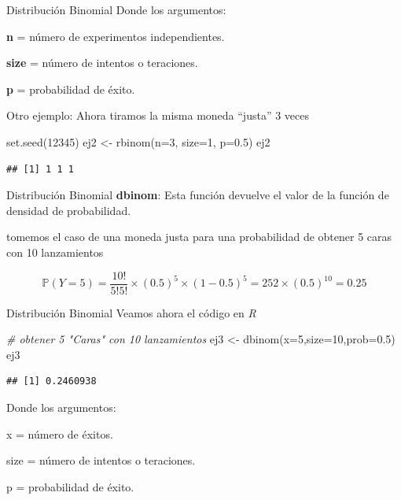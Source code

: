 \documentclass[
  8pt,
  ignorenonframetext,
]{beamer}
\newenvironment{Shaded}{\begin{snugshade}}{\end{snugshade}}
\newcommand{\AttributeTok}[1]{\textcolor[rgb]{0.77,0.63,0.00}{#1}}
\newcommand{\CommentTok}[1]{\textcolor[rgb]{0.56,0.35,0.01}{\textit{#1}}}
\newcommand{\DecValTok}[1]{\textcolor[rgb]{0.00,0.00,0.81}{#1}}
\newcommand{\FloatTok}[1]{\textcolor[rgb]{0.00,0.00,0.81}{#1}}
\newcommand{\FunctionTok}[1]{\textcolor[rgb]{0.00,0.00,0.00}{#1}}
\newcommand{\NormalTok}[1]{#1}
\newcommand{\OtherTok}[1]{\textcolor[rgb]{0.56,0.35,0.01}{#1}}
\begin{document}
\begin{frame}[fragile]{Distribución Binomial}
\protect\hypertarget{distribuciuxf3n-binomial-1}{}
Donde los argumentos:

\textbf{n} = número de experimentos independientes.

\textbf{size} = número de intentos o teraciones.

\textbf{p} = probabilidad de éxito.

Otro ejemplo: Ahora tiramos la misma moneda ``justa'' 3 veces

\begin{Shaded}
\begin{Highlighting}[]
\FunctionTok{set.seed}\NormalTok{(}\DecValTok{12345}\NormalTok{)}
\NormalTok{ej2 }\OtherTok{\textless{}{-}} \FunctionTok{rbinom}\NormalTok{(}\AttributeTok{n=}\DecValTok{3}\NormalTok{, }\AttributeTok{size=}\DecValTok{1}\NormalTok{, }\AttributeTok{p=}\FloatTok{0.5}\NormalTok{) }
\NormalTok{ej2}
\end{Highlighting}
\end{Shaded}

\begin{verbatim}
## [1] 1 1 1
\end{verbatim}
\end{frame}

\begin{frame}{Distribución Binomial}
\protect\hypertarget{distribuciuxf3n-binomial-2}{}
\textbf{dbinom}: Esta función devuelve el valor de la función de
densidad de probabilidad.

tomemos el caso de una moneda justa para una probabilidad de obtener 5
caras con 10 lanzamientos

\[\mathbb{P}(Y=5) =  \frac{10!}{5! 5!} \times (0.5)^{5} \times (1-0.5)^{5} = 252 \times (0.5)^{10} = 0.25\]
\end{frame}

\begin{frame}[fragile]{Distribución Binomial}
\protect\hypertarget{distribuciuxf3n-binomial-3}{}
Veamos ahora el código en \emph{R}

\begin{Shaded}
\begin{Highlighting}[]
\CommentTok{\#  obtener 5 "Caras" con 10 lanzamientos}
\NormalTok{ej3 }\OtherTok{\textless{}{-}} \FunctionTok{dbinom}\NormalTok{(}\AttributeTok{x=}\DecValTok{5}\NormalTok{,}\AttributeTok{size=}\DecValTok{10}\NormalTok{,}\AttributeTok{prob=}\FloatTok{0.5}\NormalTok{)}
\NormalTok{ej3}
\end{Highlighting}
\end{Shaded}

\begin{verbatim}
## [1] 0.2460938
\end{verbatim}

Donde los argumentos:

x = número de éxitos.

size = número de intentos o teraciones.

p = probabilidad de éxito.
\end{frame}
\end{document}
